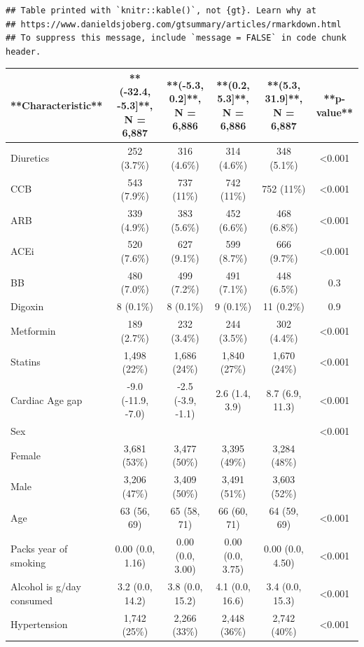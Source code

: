 \documentclass[
]{article}
\begin{document}
\begin{verbatim}
## Table printed with `knitr::kable()`, not {gt}. Learn why at
## https://www.danieldsjoberg.com/gtsummary/articles/rmarkdown.html
## To suppress this message, include `message = FALSE` in code chunk header.
\end{verbatim}

\begin{tabular}{l|c|c|c|c|c}
\hline
**Characteristic** & **(-32.4, -5.3]**, N = 6,887 & **(-5.3, 0.2]**, N = 6,886 & **(0.2, 5.3]**, N = 6,886 & **(5.3, 31.9]**, N = 6,887 & **p-value**\\
\hline
Diuretics & 252 (3.7\%) & 316 (4.6\%) & 314 (4.6\%) & 348 (5.1\%) & <0.001\\
\hline
CCB & 543 (7.9\%) & 737 (11\%) & 742 (11\%) & 752 (11\%) & <0.001\\
\hline
ARB & 339 (4.9\%) & 383 (5.6\%) & 452 (6.6\%) & 468 (6.8\%) & <0.001\\
\hline
ACEi & 520 (7.6\%) & 627 (9.1\%) & 599 (8.7\%) & 666 (9.7\%) & <0.001\\
\hline
BB & 480 (7.0\%) & 499 (7.2\%) & 491 (7.1\%) & 448 (6.5\%) & 0.3\\
\hline
Digoxin & 8 (0.1\%) & 8 (0.1\%) & 9 (0.1\%) & 11 (0.2\%) & 0.9\\
\hline
Metformin & 189 (2.7\%) & 232 (3.4\%) & 244 (3.5\%) & 302 (4.4\%) & <0.001\\
\hline
Statins & 1,498 (22\%) & 1,686 (24\%) & 1,840 (27\%) & 1,670 (24\%) & <0.001\\
\hline
Cardiac Age gap & -9.0 (-11.9, -7.0) & -2.5 (-3.9, -1.1) & 2.6 (1.4, 3.9) & 8.7 (6.9, 11.3) & <0.001\\
\hline
Sex &  &  &  &  & <0.001\\
\hline
Female & 3,681 (53\%) & 3,477 (50\%) & 3,395 (49\%) & 3,284 (48\%) & \\
\hline
Male & 3,206 (47\%) & 3,409 (50\%) & 3,491 (51\%) & 3,603 (52\%) & \\
\hline
Age & 63 (56, 69) & 65 (58, 71) & 66 (60, 71) & 64 (59, 69) & <0.001\\
\hline
Packs year of smoking & 0.00 (0.0, 1.16) & 0.00 (0.0, 3.00) & 0.00 (0.0, 3.75) & 0.00 (0.0, 4.50) & <0.001\\
\hline
Alcohol is g/day consumed & 3.2 (0.0, 14.2) & 3.8 (0.0, 15.2) & 4.1 (0.0, 16.6) & 3.4 (0.0, 15.3) & <0.001\\
\hline
Hypertension & 1,742 (25\%) & 2,266 (33\%) & 2,448 (36\%) & 2,742 (40\%) & <0.001\\

\end{tabular}
\end{document}
